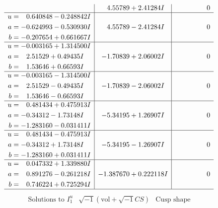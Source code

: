 \documentclass[1p]{elsarticle_modified}
\theoremstyle{definition}
\newcommand{\I}{\sqrt{-1}}
\begin{document}
$$\begin{array}{c|c|c}
 & \phantom{-}4.55789 + 2.41284 I & \phantom{-0.000000 } 0 \\ \hline\begin{aligned}
u &= \phantom{-}0.640848 - 0.248842 I \\
a &= -0.624993 - 0.530930 I \\
b &= -0.207654 + 0.661667 I\end{aligned}
 & \phantom{-}4.55789 - 2.41284 I & \phantom{-0.000000 } 0 \\ \hline\begin{aligned}
u &= -0.003165 + 1.314500 I \\
a &= \phantom{-}2.51529 + 0.49435 I \\
b &= \phantom{-}1.53646 + 0.66593 I\end{aligned}
 & -1.70839 + 2.06002 I & \phantom{-0.000000 } 0 \\ \hline\begin{aligned}
u &= -0.003165 - 1.314500 I \\
a &= \phantom{-}2.51529 - 0.49435 I \\
b &= \phantom{-}1.53646 - 0.66593 I\end{aligned}
 & -1.70839 - 2.06002 I & \phantom{-0.000000 } 0 \\ \hline\begin{aligned}
u &= \phantom{-}0.481434 + 0.475913 I \\
a &= -0.34312 - 1.73148 I \\
b &= -1.283160 - 0.031411 I\end{aligned}
 & -5.34195 + 1.26907 I & \phantom{-0.000000 } 0 \\ \hline\begin{aligned}
u &= \phantom{-}0.481434 - 0.475913 I \\
a &= -0.34312 + 1.73148 I \\
b &= -1.283160 + 0.031411 I\end{aligned}
 & -5.34195 - 1.26907 I & \phantom{-0.000000 } 0 \\ \hline\begin{aligned}
u &= \phantom{-}0.047332 + 1.339880 I \\
a &= \phantom{-}0.891276 - 0.261218 I \\
b &= \phantom{-}0.746224 + 0.725294 I\end{aligned}
 & -1.387670 + 0.222118 I & \phantom{-0.000000 } 0\\
 \hline 
 \end{array}$$\newpage$$\begin{array}{c|c|c}  
\text{Solutions to }I^u_{1}& \I (\text{vol} + \sqrt{-1}CS) & \text{Cusp shape}\\

\end{array}$$
\end{document}
